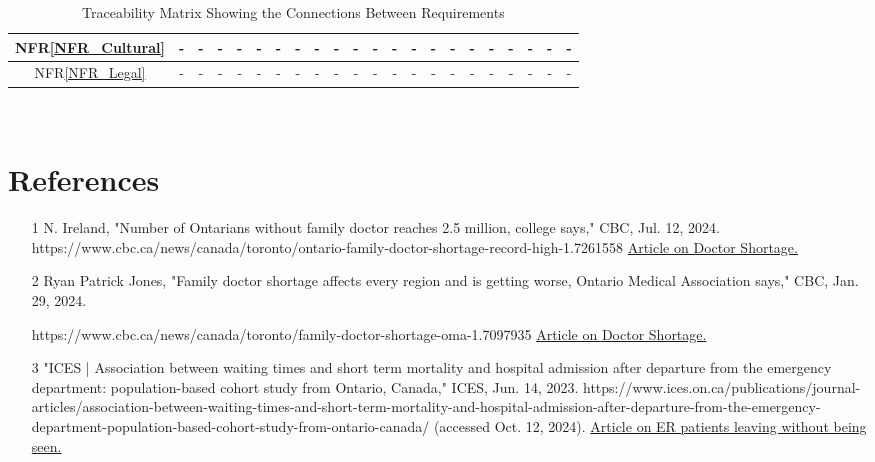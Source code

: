 \documentclass[12pt]{article}
\begin{document}
\begin{itemize}
\begin{itemize}
\begin{landscape}
\begin{table}[H]
\begin{tabular}{|c|c|c|c|c|c|c|c|c|c|c|c|c|c|c|c|c|c|c|c|c|c|}
      NFR\ref{NFR_Cultural} & - & - & - & - & - & - & - & - & - & - & - & - & - & - & - & - & - & - & - & - & - \\ \hline
      NFR\ref{NFR_Legal} & - & - & - & - & - & - & - & - & - & - & - & - & - & - & - & - & - & - & - & - & - \\ \hline
      \end{tabular}
      \caption{Traceability Matrix Showing the Connections Between Requirements}
      \label{Table:A_trace}
      \end{table}
    \end{landscape}

~\newpage

\section{References}
\begin{itemize}
  \item
  [1]N. Ireland, "Number of Ontarians without family doctor reaches 2.5 million, college says," CBC, Jul. 12, 2024. https://www.cbc.ca/news/canada/toronto/ontario-family-doctor-shortage-record-high-1.7261558
  \href{https://www.cbc.ca/news/canada/toronto/ontario-family-doctor-shortage-record-high-1.7261558}{Article on Doctor Shortage.}
  \item 
  [2]Ryan Patrick Jones, "Family doctor shortage affects every region and is getting worse, Ontario Medical Association says," CBC, Jan. 29, 2024.
  
  https://www.cbc.ca/news/canada/toronto/family-doctor-shortage-oma-1.7097935
  \href{https://www.cbc.ca/news/canada/toronto/family-doctor-shortage-oma-1.7097935}{Article on Doctor Shortage.}
  \item
  [3]"ICES | Association between waiting times and short term mortality and hospital admission after departure from the emergency department: population-based cohort study from Ontario, Canada," ICES, Jun. 14, 2023. https://www.ices.on.ca/publications/journal-articles/association-between-waiting-times-and-short-term-mortality-and-hospital-admission-after-departure-from-the-emergency-department-population-based-cohort-study-from-ontario-canada/ (accessed Oct. 12, 2024).
  \href{https://www.ices.on.ca/publications/journal-articles/association-between-waiting-times-and-short-term-mortality-and-hospital-admission-after-departure-from-the-emergency-department-population-based-cohort-study-from-ontario-canada/}{Article on ER patients leaving without being seen.}
\end{itemize}


\end{itemize}
\end{itemize}
\end{document}
